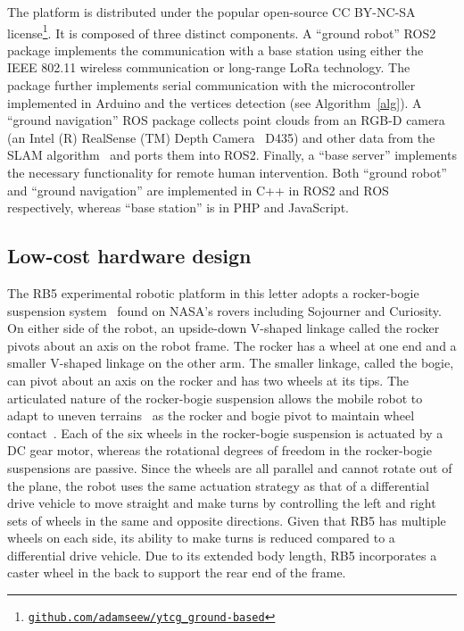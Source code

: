 \documentclass[lettersize,journal]{IEEEtran}
\theoremstyle{definition}
\begin{document}
The %
platform
is distributed under the popular open-source CC BY-NC-SA license\footnote{{\tt\footnotesize \href{https://github.com/adamseew/ytcg_ground-based}{github.com/adamseew/ytcg\_ground-based}}}. It is composed of three distinct components. A ``ground robot'' ROS2~\cite{quigley2009ros} package implements the communication with a base station using either the IEEE 802.11 wireless communication or long-range LoRa technology. The package further implements serial communication with the microcontroller implemented in Arduino and the vertices detection (see Algorithm~\ref{alg}). A ``ground navigation'' ROS package collects point clouds from an RGB-D camera (an Intel (R) RealSense (TM) Depth Camera~\cite{keselman2017intel} D435) and other data from the SLAM algorithm~\cite{labbe2019rtab} and ports them into ROS2. Finally, a ``base server'' implements the necessary functionality for remote human intervention.
Both ``ground robot'' and ``ground navigation'' are implemented in C++ in ROS2 and ROS respectively, whereas ``base station'' is in PHP and JavaScript.

\subsection{Low-cost hardware design}
\label{sec:md}

The RB5 experimental robotic platform in this letter adopts a rocker-bogie suspension system~\cite{bickler1989articulated} found on NASA's rovers including Sojourner and Curiosity. On either side of the robot, an upside-down V-shaped linkage called the rocker pivots about an axis on the robot frame. The rocker has a wheel at one end and a smaller V-shaped linkage on the other arm. The smaller linkage, called the bogie, can pivot about an axis on the rocker and has two wheels at its tips. The articulated nature of the rocker-bogie suspension allows the mobile robot to adapt to uneven terrains~\cite{kim2012optimal,mann2005dynamic,faisal2021low} as the rocker and bogie pivot to maintain wheel contact~\cite{mann2005dynamic}.
%
Each of the six wheels in the rocker-bogie suspension is actuated by a DC gear motor, whereas the rotational degrees of freedom in the rocker-bogie suspensions are passive. Since the wheels are all parallel and cannot rotate out of the plane, the robot uses the same actuation strategy as that of a differential drive vehicle to move straight and make turns by controlling the left and right sets of wheels in the same and opposite directions. Given that RB5 has multiple wheels on each side, its ability to make turns is reduced compared to a differential drive vehicle. Due to its extended body length, RB5 incorporates a caster wheel in the back to support the rear end of the frame.
\end{document}
